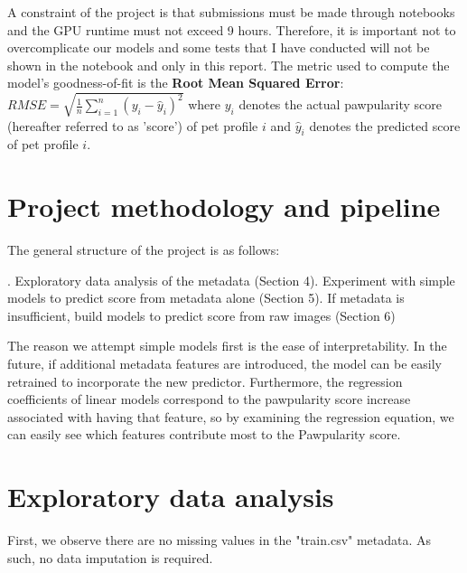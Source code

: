 \documentclass[12pt]{article}
\begin{document}
\noindent A constraint of the project is that submissions must be made through notebooks and the GPU runtime must not exceed 9 hours. Therefore, it is important not to overcomplicate our models and some tests that I have conducted will not be shown in the notebook and only in this report. The metric used to compute the model's goodness-of-fit is the \textbf{Root Mean Squared Error}: $RMSE=\sqrt{\frac{1}{n} \sum_{i=1}^{n} (y_i - \hat{y}_i)^2}$ where $y_i$ denotes the actual pawpularity score (hereafter referred to as 'score') of pet profile $i$ and $\hat{y}_i$ denotes the predicted score of pet profile $i$.

\section{Project methodology and pipeline}

The general structure of the project is as follows:

. Exploratory data analysis of the metadata (Section 4). Experiment with simple models to predict score from metadata alone (Section 5). If metadata is insufficient, build models to predict score from raw images (Section 6)\newline

The reason we attempt simple models first is the ease of interpretability. In the future, if additional metadata features are introduced, the model can be easily retrained to incorporate the new predictor. Furthermore, the regression coefficients of linear models correspond to the pawpularity score increase associated with having that feature, so by examining the regression equation, we can easily see which features contribute most to the Pawpularity score.

\section{Exploratory data analysis}

First, we observe there are no missing values in the "train.csv" metadata. As such, no data imputation is required.\newline
\end{document}
